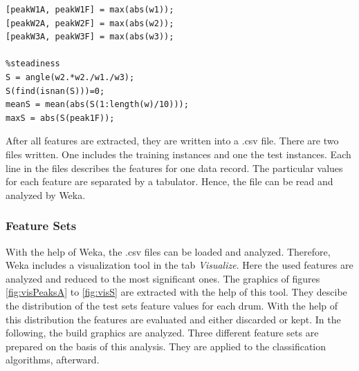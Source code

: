 \begin{lstlisting}[caption={Calculation of the maximum peaks and maximum and minimum steadiness within the three subsequent frames w1, w2 and w3.},label={lst:featuresFrames}]
% max frame peaks   
[peakW1A, peakW1F] = max(abs(w1));
[peakW2A, peakW2F] = max(abs(w2));
[peakW3A, peakW3F] = max(abs(w3));    

%steadiness     
S = angle(w2.*w2./w1./w3); 
S(find(isnan(S)))=0;
meanS = mean(abs(S(1:length(w)/10)));     
maxS = abs(S(peak1F));
\end{lstlisting}

After all features are extracted, they are written into a .csv file. There are two files written. One includes the training instances and one the test instances. Each line in the files describes the features for one data record. The particular values for each feature are separated by a tabulator. Hence, the file can be read and analyzed by Weka.

\subsubsection{Feature Sets}

With the help of Weka, the .csv files can be loaded and analyzed. Therefore, Weka includes a visualization tool in the tab \textit{Visualize}. Here the used features are analyzed and reduced to the most significant ones. The graphics of figures \ref{fig:visPeaksA} to  \ref{fig:visS} are extracted with the help of this tool. They descibe the distribution of the test sets feature values for each drum. With the help of this distribution the features are evaluated and either discarded or kept. In the following, the build graphics are analyzed. Three different feature sets are prepared on the basis of this analysis. They are applied to the classification algorithms, afterward.

